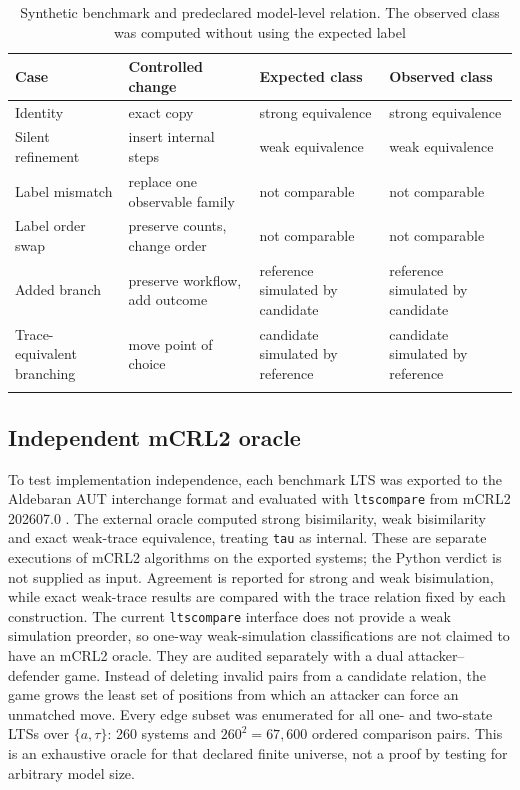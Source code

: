 \documentclass[pdflatex,sn-mathphys-ay]{sn-jnl}
\theoremstyle{definition}
\newcommand{\TAU}{\tau}
\begin{document}
\begin{table}[t]
\caption{Synthetic benchmark and predeclared model-level relation. The observed
class was computed without using the expected label}\label{tab:synthetic}
\centering
\small
\begin{tabularx}{\textwidth}{@{}>{\raggedright\arraybackslash}p{}>{\raggedright\arraybackslash}p{}YY@{}}
\toprule
Case & Controlled change & Expected class & Observed class \\
\midrule
Identity & exact copy & strong equivalence & strong equivalence \\
Silent refinement & insert internal steps & weak equivalence & weak equivalence \\
Label mismatch & replace one observable family & not comparable & not comparable \\
Label order swap & preserve counts, change order & not comparable & not comparable \\
Added branch & preserve workflow, add outcome & reference simulated by candidate & reference simulated by candidate \\
Trace-equivalent branching & move point of choice & candidate simulated by reference & candidate simulated by reference \\
\botrule
\end{tabularx}
\end{table}

\subsection{Independent mCRL2 oracle}\label{sec:mcrl2-method}

To test implementation independence, each benchmark LTS was exported to the
Aldebaran AUT interchange format and evaluated with \texttt{ltscompare} from
mCRL2 202607.0 \citep{Bunte2019}. The external oracle computed strong
bisimilarity, weak bisimilarity and exact weak-trace equivalence, treating
\texttt{tau} as internal. These are separate executions of mCRL2 algorithms on
the exported systems; the Python verdict is not supplied as input. Agreement is
reported for strong and weak bisimulation, while exact weak-trace results are
compared with the trace relation fixed by each construction. The current
\texttt{ltscompare} interface does not provide a weak simulation preorder, so
one-way weak-simulation classifications are not claimed to have an mCRL2 oracle.
They are audited separately with a dual attacker--defender game. Instead of
deleting invalid pairs from a candidate relation, the game grows the least set
of positions from which an attacker can force an unmatched move. Every edge
subset was enumerated for all one- and two-state LTSs over
$\{a,\TAU\}$: 260 systems and $260^2=67{,}600$ ordered comparison pairs. This is
an exhaustive oracle for that declared finite universe, not a proof by testing
for arbitrary model size.
\end{document}
